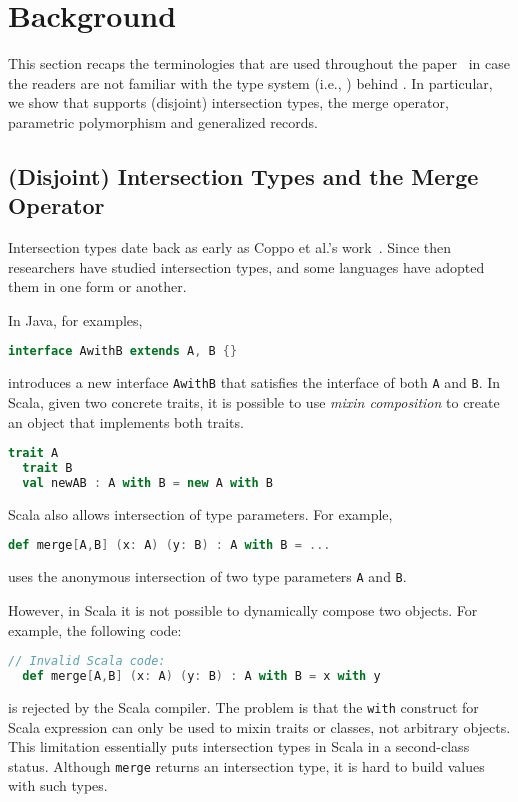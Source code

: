 
\section{Background}
\label{sec:background}

This section recaps the terminologies that are used throughout the
paper~\cite{oliveira2016disjoint, alpuimdisjoint} in case the readers are not
familiar with the type system (i.e., \bname) behind \name. In particular, we
show that \name supports (disjoint) intersection types, the merge operator,
parametric polymorphism and generalized records.

\subsection{(Disjoint) Intersection Types and the Merge Operator}
\label{sec:intersection}

Intersection types date back as early as Coppo et al.'s
work~\cite{coppo1981functional}. Since then researchers have studied
intersection types, and some languages have adopted them in one form or another.

In Java, for examples,
\begin{lstlisting}[language=java]
  interface AwithB extends A, B {}
\end{lstlisting}
introduces a new interface \lstinline$AwithB$ that satisfies the interface of
both \lstinline{A} and \lstinline{B}. In Scala, given two concrete traits, it is
possible to use \textit{mixin composition} to create an object that implements
both traits.
\begin{lstlisting}[language=scala]
  trait A
  trait B
  val newAB : A with B = new A with B
\end{lstlisting}
Scala also allows intersection of type parameters. For example,
\begin{lstlisting}[language=scala]
  def merge[A,B] (x: A) (y: B) : A with B = ...
\end{lstlisting}
uses the anonymous intersection of two type parameters \lstinline{A} and
\lstinline{B}.

However, in Scala it is not possible to dynamically compose two objects. For
example, the following code:
\begin{lstlisting}[language=scala]
  // Invalid Scala code:
  def merge[A,B] (x: A) (y: B) : A with B = x with y
\end{lstlisting}
is rejected by the Scala compiler. The problem is that the \lstinline$with$
construct for Scala expression can only be used to mixin traits or classes, not
arbitrary objects. This limitation essentially puts intersection types in Scala
in a second-class status. Although \lstinline{merge} returns an intersection
type, it is hard to build values with such types.

